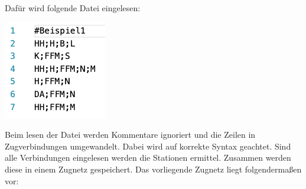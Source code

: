 Dafür wird folgende Datei eingelesen:\\
\begin{center}
    \includegraphics[width=\linewidth]{images/Programmdurchlauf/eingabedatei.png}
    \label{test:subsecpar:eingabedatei}
\end{center}

Beim lesen der Datei werden Kommentare ignoriert und die Zeilen in Zugverbindungen umgewandelt. Dabei wird auf korrekte Syntax geachtet.
Sind alle Verbindungen eingelesen werden die Stationen ermittel. Zusammen werden diese in einem Zugnetz gespeichert. Das vorliegende Zugnetz liegt folgendermaßen vor:\\

